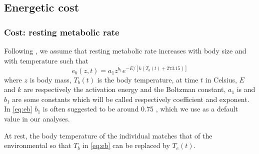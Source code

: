 \subsection*{Energetic cost}
\subsubsection*{Cost: resting metabolic rate}
Following \citet{Brown2004}, we assume that resting metabolic rate increases with body size and with temperature such that
\begin{equation} \label{eq:eb}
	e_b(z, t) = a_1 z^{b_1} e^{-E/[k (T_b(t)+ 273.15)]}
\end{equation}
where $z$ is body mass, $T_b(t)$ is the body temperature, at time $t$ in Celsius, $E$ and $k$ are respectively the activation energy and the Boltzman constant, $a_1$ is and $b_1$ are some constants which will be called respectively coefficient and exponent.
In \cref{eq:eb} $b_1$ is often suggested to be around 0.75 \citep{Kleiber1947, Peters1986, Brown2004}, which we use as a default value in our analyses.

At rest, the body temperature of the individual matches that of the environmental \citep[e.g.,][]{Bartholomew1978} so that $T_b$ in \cref{eq:eb} can be replaced by $T_e(t)$.

